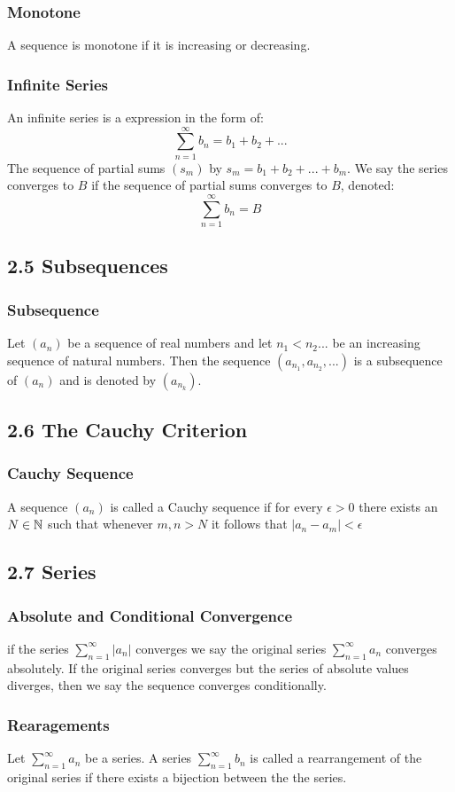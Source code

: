 \documentclass{article}
\begin{document}
\subsubsection*{Monotone}
A sequence is monotone if it is increasing or decreasing.

\subsubsection*{Infinite Series}
An infinite series is a expression in the form of:
\begin{equation*}
\sum_{n=1}^{\infty} b_n = b_1 + b_2 + ...
\end{equation*}
The sequence of partial sums $(s_m)$ by $s_m = b_1 + b_2 + ... + b_m$. We say the series converges to $B$ if the sequence of partial sums converges to $B$, denoted:
\begin{equation*}
\sum_{n=1}^{\infty} b_n = B
\end{equation*}

\subsection*{2.5 Subsequences}
\subsubsection*{Subsequence}
Let $(a_n)$ be a sequence of real numbers and let $n_1 < n_2 ...$ be an increasing sequence of natural numbers.
Then the sequence $(a_{n_1}, a_{n_2},...)$ is a subsequence of $(a_n)$ and is denoted by $(a_{n_k})$.

\subsection*{2.6 The Cauchy Criterion}
\subsubsection*{Cauchy Sequence}
A sequence $(a_n)$ is called a Cauchy sequence if for every $\epsilon > 0$ there exists an $N \in \protect\mathbb{N}$ such that whenever $m,n>N$ it follows that $|a_n -a_m|<\epsilon$

\subsection*{2.7 Series}
\subsubsection*{Absolute and Conditional Convergence}
if the series $\sum_{n=1}^{\infty} |a_n|$ converges we say the original series $\sum_{n=1}^{\infty} a_n$ converges absolutely. If the original series converges but the series of absolute values diverges, then we say the sequence converges conditionally.

\subsubsection*{Rearagements}
Let $\sum_{n=1}^{\infty} a_n$ be a series. A series $\sum_{n=1}^{\infty} b_n$ is called a rearrangement of the original series if there exists a bijection between the the series.
\end{document}
